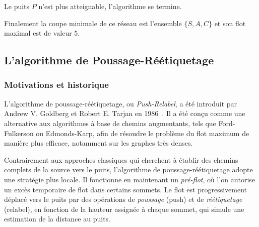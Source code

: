 \documentclass[a4paper]{article}
\begin{document}
	\begin{center}
	\end{center}
Le puits $P$ n'est plus atteignable, l'algorithme se termine.

Finalement la coupe minimale de ce réseau est l'ensemble $\{S,A,C\}$ et son flot maximal est de valeur $5$.

\subsection{L'algorithme de Poussage-Réétiquetage}

\subsubsection{Motivations et historique}

L’algorithme de poussage-réétiquetage, ou \emph{Push-Relabel}, a été introduit par Andrew V. Goldberg et Robert E. Tarjan en 1986~\cite{goldberg1988new}. Il a été conçu comme une alternative aux algorithmes à base de chemins augmentants, tels que Ford-Fulkerson ou Edmonds-Karp, afin de résoudre le problème du flot maximum de manière plus efficace, notamment sur les graphes très denses.

Contrairement aux approches classiques qui cherchent à établir des chemins complets de la source vers le puits, l’algorithme de poussage-réétiquetage adopte une stratégie plus locale. Il fonctionne en maintenant un \emph{pré-flot}, où l’on autorise un excès temporaire de flot dans certains sommets. Le flot est progressivement déplacé vers le puits par des opérations de \textit{poussage} (push) et de \textit{réétiquetage} (relabel), en fonction de la hauteur assignée à chaque sommet, qui simule une estimation de la distance au puits.
\end{document}
